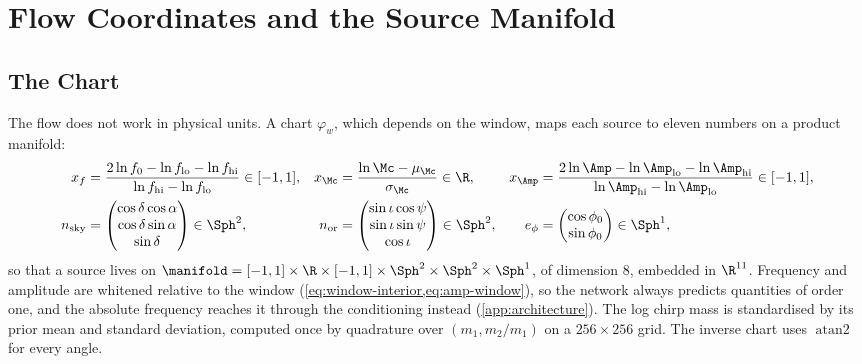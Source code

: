 \section{Flow Coordinates and the Source Manifold}
\label{app:geometry}

\subsection{The Chart}
\label{app:geometry-chart}

The flow does not work in physical units. A chart $\varphi_w$, which depends on the window,
maps each source to eleven numbers on a product manifold:
\begin{align}
  x_f &= \frac{2\ln f_0 - \ln f_{\rm lo} - \ln f_{\rm hi}}{\ln f_{\rm hi} - \ln f_{\rm lo}}\in[-1,1], &
  x_{\Mc} &= \frac{\ln\Mc - \mu_{\Mc}}{\sigma_{\Mc}}\in\R, &
  x_{\Amp} &= \frac{2\ln\Amp - \ln\Amp_{\rm lo} - \ln\Amp_{\rm hi}}{\ln\Amp_{\rm hi} - \ln\Amp_{\rm lo}}\in[-1,1], \nonumber\\
  n_{\rm sky} &= \begin{pmatrix}\cos\delta\cos\alpha\\ \cos\delta\sin\alpha\\ \sin\delta\end{pmatrix}\in\Sph^2, &
  n_{\rm or} &= \begin{pmatrix}\sin\iota\cos\psi\\ \sin\iota\sin\psi\\ \cos\iota\end{pmatrix}\in\Sph^2, &
  e_{\phi} &= \begin{pmatrix}\cos\phi_0\\ \sin\phi_0\end{pmatrix}\in\Sph^1,
  \label{eq:chart}
\end{align}
so that a source lives on
$\manifold = [-1,1]\times\R\times[-1,1]\times\Sph^2\times\Sph^2\times\Sph^1$, of dimension 8,
embedded in $\R^{11}$. Frequency and amplitude are whitened relative to the window
(\cref{eq:window-interior,eq:amp-window}), so the network always predicts quantities of order
one, and the absolute frequency reaches it through the conditioning instead
(\cref{app:architecture}). The log chirp mass is standardised by its prior mean and standard
deviation, computed once by quadrature over $(m_1, m_2/m_1)$ on a $256\times256$ grid. The
inverse chart uses $\operatorname{atan2}$ for every angle.

